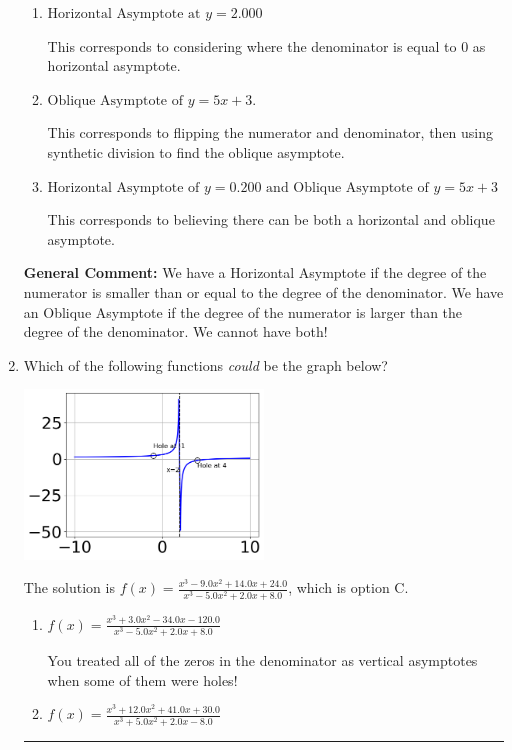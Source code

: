\documentclass{extbook}[14pt]
\newcommand{\litem}[1]{\item #1

\rule{\textwidth}{0.4pt}}
\begin{document}
\begin{enumerate}
{\begin{enumerate}[label=\Alph*.]
This corresponds to using rule for Horizontal Asymptote when degree of numerator and denominator match.
\item \( \text{Horizontal Asymptote at } y = 2.000 \)

This corresponds to considering where the denominator is equal to 0 as horizontal asymptote.
\item \( \text{Oblique Asymptote of } y = 5x + 3. \)

This corresponds to flipping the numerator and denominator, then using synthetic division to find the oblique asymptote.
\item \( \text{Horizontal Asymptote of } y = 0.200 \text{ and Oblique Asymptote of } y = 5x + 3 \)

This corresponds to believing there can be both a horizontal and oblique asymptote.
\end{enumerate}

\textbf{General Comment:} We have a Horizontal Asymptote if the degree of the numerator is smaller than or equal to the degree of the denominator. We have an Oblique Asymptote if the degree of the numerator is larger than the degree of the denominator. We cannot have both!
}
\litem{
Which of the following functions \textit{could} be the graph below?

\begin{center}
    \includegraphics[width=0.5\textwidth]{../Figures/identifyGraphOfRationalFunctionC.png}
\end{center}


The solution is \( f(x)=\frac{x^{3} -9.0 x^{2} +14.0 x + 24.0}{x^{3} -5.0 x^{2} +2.0 x + 8.0} \), which is option C.\begin{enumerate}[label=\Alph*.]
\item \( f(x)=\frac{x^{3} +3.0 x^{2} -34.0 x -120.0}{x^{3} -5.0 x^{2} +2.0 x + 8.0} \)

You treated all of the zeros in the denominator as vertical asymptotes when some of them were holes!
\item \( f(x)=\frac{x^{3} +12.0 x^{2} +41.0 x + 30.0}{x^{3} +5.0 x^{2} +2.0 x -8.0} \)


\end{enumerate}}
\end{enumerate}
\end{document}
